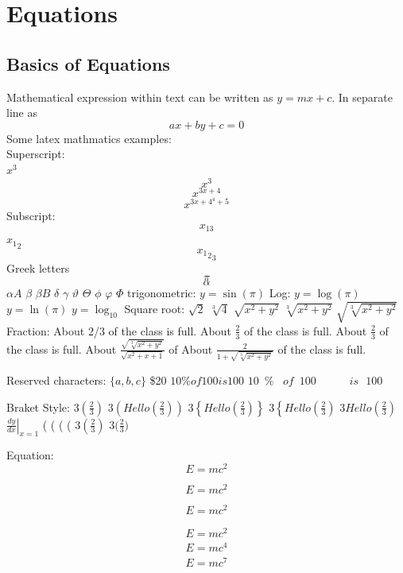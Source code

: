  
\chapter{Equations}

\section{Basics of Equations}
Mathematical expression within text can be written as $ y=mx+c $. In separate line as $$ ax + by + c = 0 $$
Some latex mathmatics examples:\\
Superscript:\\
$x^3$
$$x^3$$
$$x^{3x+4}$$
$$x^{{{3x+4}^4}+5}$$
Subscript:
$$x_{13}$$
${x_1}_2$
$${{{x_1}_2}_3}$$
Greek letters
$$\pi$$
$$\alpha$$
$\alpha A$
$\beta$
$\beta B$
$\delta$
$\gamma$
$\vartheta$
$\Theta$
$\phi$
$\varphi$
$\Phi$ 
trigonometric:
$y=\sin(\pi)$
Log:
$y=\log(\pi)$
$y=\ln(\pi)$
$y=\log_{10}$
Square root:
$\sqrt{2}$
$\sqrt[3]{4}$
$\sqrt{x^2+y^2}$
$\sqrt[3]{x^2+y^2}$
$\sqrt{\sqrt[3]{x^2+y^2}}$
Fraction:
About 2/3 of the class is full.
About $\frac{2}{3}$ of the class is full.
About $\displaystyle{\frac{2}{3}}$ of the class is full.
About $\displaystyle{\frac{\sqrt{\sqrt[3]{x^2+y^2}}}{\sqrt{x^2+x+1}}}$ of 
About $\displaystyle{\frac{2}{1+\sqrt{\sqrt[3]{x^2+y^2}}}}$ of the class is full.

Reserved characters:
$\{a,b,c\}$
\$20
$10\% of 100 is 100$
$10\,\,\,\% \;\;\; of \,\,\,100 \quad\qquad is\:\:\: 100$


Braket Style:
$3(\frac{2}{3})$
$3\left(Hello(\frac{2}{3})\right)$
$3\left\{Hello(\frac{2}{3})\right\}$
$3\left\{Hello(\frac{2}{3})\right.$
$3\left.Hello(\frac{2}{3})\right.$
$\left.\frac{dy}{dx}\right|_{x=1}$
( \big (  \Big (  \Bigg( 
$3(\frac{2}{3})$
$3\Big(\frac{2}{3}\Big)$

Equation:
\begin{equation} %
E=mc^2 
\end{equation}

\begin{equation*}
E=mc^2 
\end{equation*}

\[
E=mc^2
\]

\begin{eqnarray}
E=mc^2 \label{eqn:mc2} \\ %
E=mc^4\\
E=mc^7 
\end{eqnarray}

